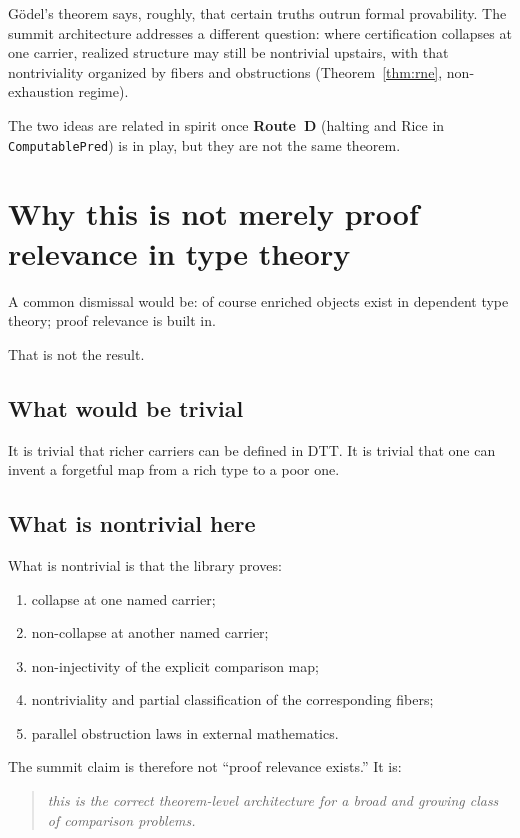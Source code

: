\documentclass[11pt]{article}
\begin{document}
G\"odel's theorem says, roughly, that certain truths outrun formal provability.
The summit architecture addresses a different question: where certification
collapses at one carrier, realized structure may still be nontrivial upstairs, with
that nontriviality organized by fibers and obstructions (Theorem~\ref{thm:rne},
non-exhaustion regime).

The two ideas are related in spirit once \textbf{Route~D} (halting and Rice in
\texttt{ComputablePred}) is in play, but they are not the same theorem.

\section{Why this is not merely proof relevance in type theory}\label{sec:not-dtt}

A common dismissal would be: of course enriched objects exist in dependent type
theory; proof relevance is built in.

That is not the result.

\subsection{What would be trivial}

It is trivial that richer carriers can be defined in DTT. It is trivial that one
can invent a forgetful map from a rich type to a poor one.

\subsection{What is nontrivial here}

What is nontrivial is that the library proves:
\begin{enumerate}[label=(\arabic*)]
  \item collapse at one named carrier;
  \item non-collapse at another named carrier;
  \item non-injectivity of the explicit comparison map;
  \item nontriviality and partial classification of the corresponding fibers;
  \item parallel obstruction laws in external mathematics.
\end{enumerate}

The summit claim is therefore not ``proof relevance exists.'' It is:
\begin{quote}
\emph{this is the correct theorem-level architecture for a broad and growing class of
comparison problems.}
\end{quote}
\end{document}
